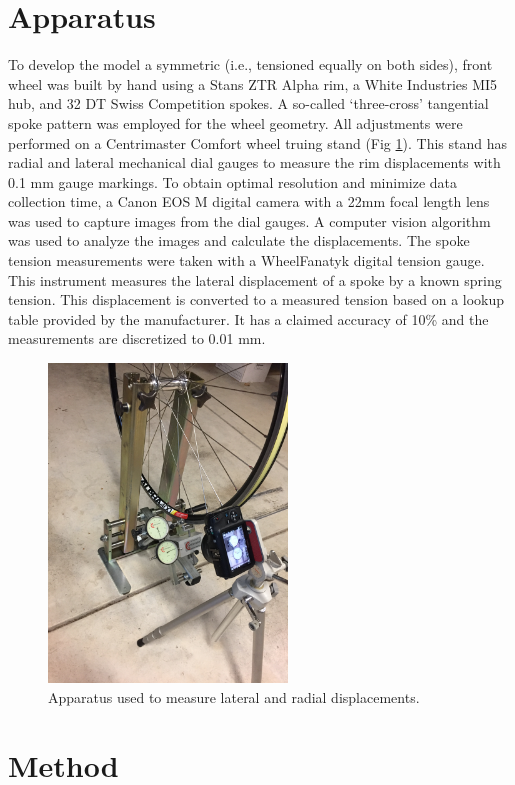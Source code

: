 \documentclass[journal]{IEEEtran}
\begin{document}
\section{Apparatus}
To develop the model a symmetric (i.e., tensioned equally on both sides), front wheel was built by hand using a Stans ZTR Alpha rim, a White Industries MI5 hub, and 32 DT Swiss Competition spokes.  A so-called `three-cross' tangential spoke pattern was employed for the wheel geometry.  All adjustments were performed on a Centrimaster Comfort wheel truing stand (Fig \ref{fig:apparatus}).  This stand has radial and lateral mechanical dial gauges to measure the rim displacements with 0.1 mm gauge markings. To obtain optimal resolution and minimize data collection time, a Canon EOS M digital camera with a 22mm focal length lens was used to capture images from the dial gauges.  A computer vision algorithm was used to analyze the images and calculate the displacements.  The spoke tension measurements were taken with a  WheelFanatyk digital tension gauge. This instrument measures the lateral displacement of a spoke by a known spring tension. This displacement is converted to a measured tension based on a lookup table provided by the manufacturer. It has a claimed accuracy of 10\% and the measurements are discretized to 0.01 mm.

\begin{figure}[!t]
\centering
\includegraphics[width=2.5in,angle=-90]{./imgs/apparat.jpg}
\caption{Apparatus used to measure lateral and radial displacements.}
\label{fig:apparatus}
\end{figure}

\section{Method}
\end{document}
